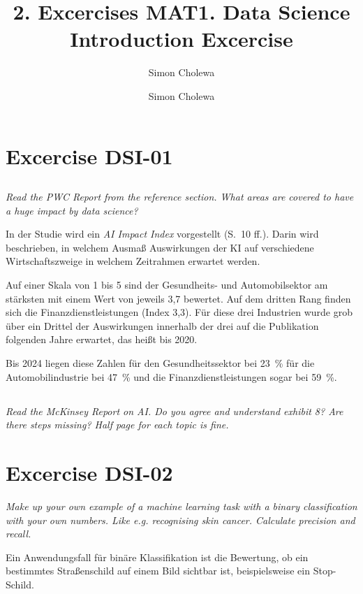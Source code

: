\documentclass[11pt,a4paper]{article}
\author{Simon Cholewa}
\title{2. Excercises MAT}
\begin{document}
\author{Simon Cholewa}
\title{1. Data Science Introduction Excercise}

\maketitle



\section{Excercise DSI-01}
\subsection{}
\textit{Read the PWC Report from the reference section.
What areas are covered to have a huge impact by data science?}

In der Studie wird ein \emph{AI Impact Index} vorgestellt (S.~10 ff.). Darin wird beschrieben, in welchem Ausmaß Auswirkungen der KI auf verschiedene Wirtschaftszweige in welchem Zeitrahmen erwartet werden.

Auf einer Skala von 1 bis 5 sind der Gesundheits- und Automobilsektor am stärksten mit einem Wert von jeweils 3,7 bewertet. Auf dem dritten Rang finden sich die Finanzdienstleistungen (Index 3,3). Für diese drei Industrien wurde grob über ein Drittel der Auswirkungen innerhalb der drei auf die Publikation folgenden Jahre erwartet, das heißt bis 2020.

Bis 2024 liegen diese Zahlen für den Gesundheitssektor bei 23~\% für die Automobilindustrie bei 47~\% und die Finanzdienstleistungen sogar bei 59~\%.

\subsection{}
\textit{Read the McKinsey Report on AI.
Do you agree and understand exhibit 8? Are there steps missing?
Half page for each topic is fine.}



\section{Excercise DSI-02}
\textit{Make up your own example of a machine learning task with a binary classification
with your own numbers. Like e.g. recognising skin cancer. Calculate precision and recall.}

Ein Anwendungsfall für binäre Klassifikation ist die Bewertung, ob ein bestimmtes Straßenschild auf einem Bild sichtbar ist, beispielsweise ein Stop-Schild.
\end{document}
